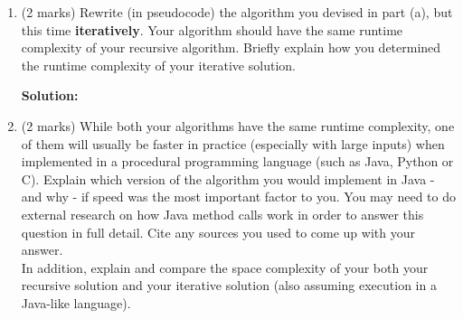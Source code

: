 \documentclass[a4,13pt]{extarticle}
\newenvironment{Solution}{\color{blue}\textbf{Solution:}}{}
\begin{document}
\begin{enumerate}
\begin{enumerate}
\begin{enumerate}
\begin{Solution}
	      	      $g(n) \in \Theta(n^d)$ where $d\geq0$, $d = 1$
	      	      
	      	      $g(n) \in \Theta(n^1)$
	      	      
	      	      $a>b^d$ is condition $3$,
	      	      
	      	      So $T(n) \in \Theta(n^{log_b(a)}) \in \Theta(n^{log_4(8)})  \in \Theta(n^{2log_4(4)}) \in \Theta(n^{2})$ for $k$ non-negative being $1$ by information about $T(1) = 1$.
	      	      	
	      	        \end{Solution}
	      	      \end{enumerate}
	      	      	      	                  
	      	\item (2 marks) Rewrite (in pseudocode) the algorithm you devised in part (a), but this time \textbf{iteratively}. 
	      	      Your algorithm should have the same runtime complexity of your recursive algorithm. Briefly explain how you determined the runtime complexity of your iterative solution.
	      	      
	      	\begin{Solution}
	      	
	      	\end{Solution}
	      	      	      	                  
	      	\item (2 marks) While both your algorithms have the same runtime complexity, one of them will usually be faster in practice 
	      	      (especially with large inputs) when implemented in a procedural programming language (such as Java, Python or C). 
	      	      Explain which version of the algorithm you would implement in Java - and why - if speed was the most important factor to you. 
	      	      You may need to do external research on how Java method calls work in order to answer this question in full detail. 
	      	      Cite any sources you used to come up with your answer.\\
	      	      	      	                  
	      	      In addition, explain and compare the space complexity of your both your recursive solution 
	      	      and your iterative solution (also assuming execution in a Java-like language).
	      	      

\end{enumerate}
\end{enumerate}
\end{document}
